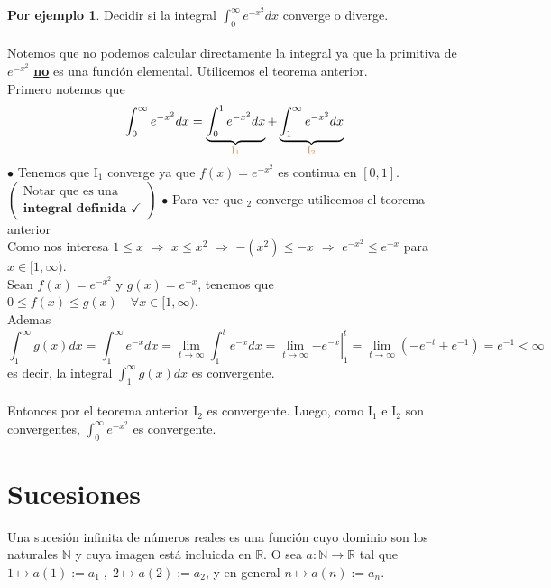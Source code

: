 \documentclass{article}
\theoremstyle{definition}
\theoremstyle{definition}
\newtheorem*{ej}{Por ejemplo}
\theoremstyle{remark}
\newcommand\N{\ensuremath{\mathbb{N}}}
\newcommand\R{\ensuremath{\mathbb{R}}}
\newcommand\ok{\checkmark}
\newcommand\infi{\infty}
\begin{document}
\begin{ej}
Decidir si la integral $\int_{0}^{\infi}{e^{-x^2}dx}$ converge o diverge. \\
\\
Notemos que no podemos calcular directamente la integral ya que la primitiva de $e^{-x^2}$ \underline{\textbf{no}} es una función elemental. Utilicemos el teorema anterior.\\
Primero notemos que \[
\int_{0}^{\infi}{e^{-x^2}dx}
=
\underbrace{\int_{0}^{1}{e^{-x^2}dx}}_{\textcolor{rojop2}{\text{I}_1}}
+
\underbrace{\int_{1}^{\infi}{e^{-x^2}dx}}_{\textcolor{rojop2}{\text{I}_2}}
\]
$\bullet$ Tenemos que \textcolor{rojop2}{I$_1$} converge ya que $f(x)=e^{-x^2}$ es continua en $[0,1]$. \quad $\left(
\begin{array}{l}
  \text{Notar que es una} \\
  \textbf{integral definida $\ok$}
\end{array}
\right)$
$\bullet$ Para ver que $ $\textcolor{rojop2}{$_2$} converge utilicemos el teorema anterior \\
Como nos interesa $1 \leq x $ \;$\Rightarrow$\; $x \leq x^2 $ \;$\Rightarrow$\; $-(x^2)\leq -x$ \;$\Rightarrow$\; $e^{-x^2}\leq e^{-x}$ para $x \in [1,\infi)$. \\
Sean $f(x)=e^{-x^2}$ y $g(x)=e^{-x}$, tenemos que $0 \leq f(x) \leq g(x)\quad \forall x \in [1,\infi)$. \\
Ademas \[
\int_1^\infi {g(x)dx}
=
\int_1^\infi {e^{-x}dx}
=
\lim_{t\to \infi} {\int_1^t {e^{-x}dx}
=
\left.\lim_{t \to \infi}{-e^{-x}}\right\vert_1^t
=
\lim_{t \to \infi} {\left(-e^{-t}+e^{-1} \right)}
=
e^{-1} < \infi
}
\]
es decir, la integral $\int_1^\infi g(x)dx$ es convergente.
\\\\Entonces por el teorema anterior \textcolor{rojop2}{I$_2$} es convergente.
Luego, como \textcolor{rojop2}{I$_1$} e \textcolor{rojop2}{I$_2$} son convergentes, $\int_0^\infi e^{-x^2}$ es convergente.
\end{ej}


\section{Sucesiones}
\begin{defi}
Una sucesión infinita de números reales es una función cuyo dominio son los naturales $\N$ y cuya imagen está incluicda en $\R$. O sea $a : \N \to \R $ tal que $1 \mapsto a(1) := a_1 \; ,\;  2 \mapsto a(2) := a_2 $, y en general $n \mapsto a(n) := a_n$.
\end{defi}
\end{document}
